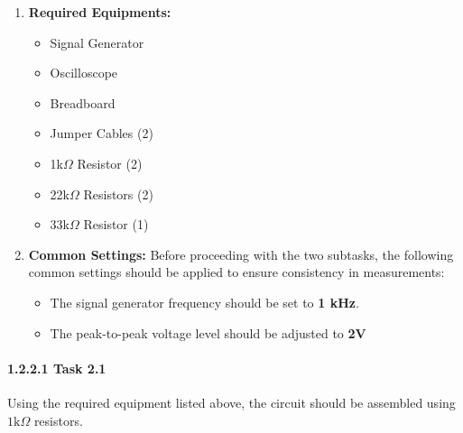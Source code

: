 \documentclass{article}
\begin{document}
\begin{enumerate}
    \item \textbf{Required Equipments:} 
    \begin{itemize} 
    \item Signal Generator 
    \item Oscilloscope 
    \item Breadboard 
    \item Jumper Cables (2) 
    \item 1k$\Omega$ Resistor (2) 
    \item 22k$\Omega$ Resistors (2) 
    \item 33k$\Omega$ Resistor (1) 
  \end{itemize}
  \item \textbf{Common Settings:} Before proceeding with the two subtasks, the following common settings should be applied to ensure consistency in measurements:
    \begin{itemize}
      \item The signal generator frequency should be set to \textbf{1 kHz}.

      \item The peak-to-peak voltage level should be adjusted to \textbf{2V}
    \end{itemize}
\end{enumerate}


\paragraph{1.2.2.1 Task 2.1}

Using the required equipment listed above, the circuit should be assembled using $ 1\text{k} \Omega $ resistors.
\end{document}
